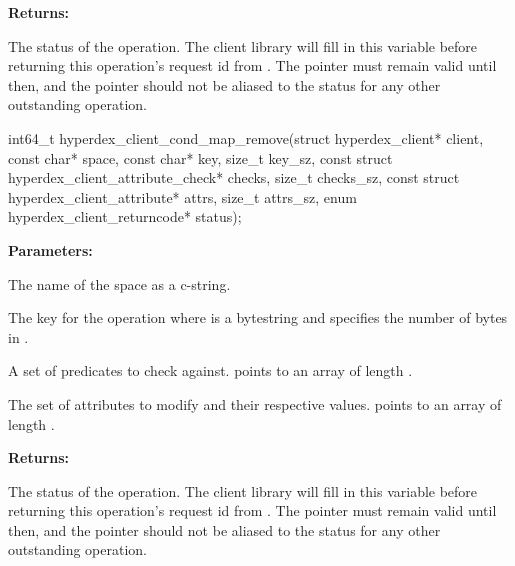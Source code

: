 \noindent\textbf{Returns:}
\begin{description}[labelindent=\widthof{{\code{status}}},leftmargin=*,noitemsep,nolistsep,align=right]
\item[\code{status}] The status of the operation.  The client library will fill in this variable before returning this operation's request id from .  The pointer must remain valid until then, and the pointer should not be aliased to the status for any other outstanding operation.
\end{description}

\funcsep
{}
\begin{ccode}
int64_t hyperdex_client_cond_map_remove(struct hyperdex_client* client,
                const char* space,
                const char* key, size_t key_sz,
                const struct hyperdex_client_attribute_check* checks, size_t checks_sz,
                const struct hyperdex_client_attribute* attrs, size_t attrs_sz,
                enum hyperdex_client_returncode* status);
\end{ccode}
\funcdesc 

\noindent\textbf{Parameters:}
\begin{description}[labelindent=\widthof{{\code{checks}, \code{checks\_sz}}},leftmargin=*,noitemsep,nolistsep,align=right]
\item[\code{space}] The name of the space as a c-string.
\item[\code{key}, \code{key\_sz}] The key for the operation where  is a bytestring and  specifies the number of bytes in .
\item[\code{checks}, \code{checks\_sz}] A set of predicates to check against.   points to an array of length .
\item[\code{attrs}, \code{attrs\_sz}] The set of attributes to modify and their respective values.   points to an array of length .
\end{description}

\noindent\textbf{Returns:}
\begin{description}[labelindent=\widthof{{\code{status}}},leftmargin=*,noitemsep,nolistsep,align=right]
\item[\code{status}] The status of the operation.  The client library will fill in this variable before returning this operation's request id from .  The pointer must remain valid until then, and the pointer should not be aliased to the status for any other outstanding operation.
\end{description}

